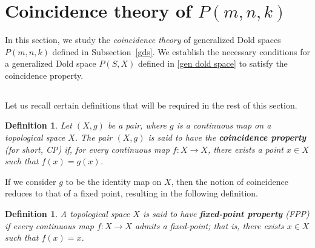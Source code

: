 \documentclass{amsart}
\newtheorem{definition}[theorem]{Definition}
\newcommand{\subsecref}[1]{Subsection~\ref{#1}}
\begin{document}
	
	
	
	\section{Coincidence theory of $P(m,n,k)$} \label{section 4}
	In this section, we study the \textit{coincidence theory} of generalized Dold %
spaces $P(m,n,k)$ defined in \subsecref{gds}. We establish the necessary conditions for a %
generalized Dold space $P(S,X)$ defined in \eqref{gen dold space} to satisfy the coincidence property. 
	
	\subsection{} Let us recall certain definitions that will be required in the rest of this section.
	
	\begin{definition}
		Let $(X,g)$ be a pair, where $g$ is a continuous map on a topological space $X$. The pair $(X,g)$ is said to have the %
\textbf{coincidence property} (for short, %
CP) if, for every continuous map $f : X \to X$, there exists a point $x \in X$ such that $f(x) = g(x)$.
	\end{definition}
	
	If we consider $g$ to be the identity map on $X$, then the notion of coincidence reduces to that of a fixed point, resulting %
in the following definition.
	
	
	
	\begin{definition}
		A %
topological space $X$ is said to have \textbf{fixed-point property} (FPP) if every continuous map $f : X \to X$ admits a fixed-point; that is, there exists $x \in X$ such that $f(x) = x$.
	\end{definition}
	
\end{document}
